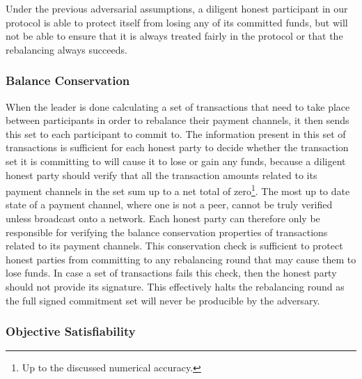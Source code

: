\documentclass[sigconf]{acmart}
\begin{document}

Under the previous adversarial assumptions, a diligent honest participant in our protocol is able to protect itself from losing any of its committed funds, but will not be able to ensure that it is always treated fairly in the protocol or that the rebalancing always succeeds.

\subsubsection{Balance Conservation}
When the leader is done calculating a set of transactions that need to take place between participants in order to rebalance their payment channels, it then sends this set to each participant to commit to.
The information present in this set of transactions is sufficient for each honest party to decide whether the transaction set it is committing to will cause it to lose or gain any funds, because a diligent honest party should verify that all the transaction amounts related to its payment channels in the set sum up to a net total of zero\footnote{Up to the discussed numerical accuracy.}.
The most up to date state of a payment channel, where one is not a peer, cannot be truly verified unless broadcast onto a network. Each honest party can therefore only be responsible for verifying the balance conservation properties of transactions related to its payment channels.
This conservation check is sufficient to protect honest parties from committing to any rebalancing round that may cause them to lose funds. In case a set of transactions fails this check, then the honest party should not provide its signature. This effectively halts the rebalancing round as the full signed commitment set will never be producible by the adversary.

\subsubsection{Objective Satisfiability}
\end{document}
